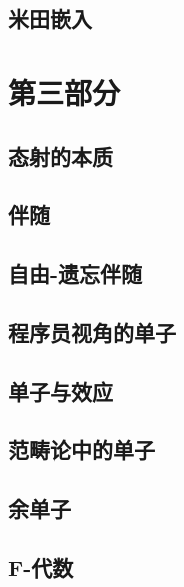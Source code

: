 \chapter{米田嵌入}\label{yoneda-embedding}


\part*{第三部分}

\chapter{态射的本质}\label{all-about-morphisms}


\chapter{伴随}\label{adjunctions}


\chapter{自由-遗忘伴随}\label{free-forgetful-adjunctions}


\chapter{程序员视角的单子}\label{monads-programmers-definition}


\chapter{单子与效应}\label{monads-and-effects}


\chapter{范畴论中的单子}\label{monads-categorically}


\chapter{余单子}\label{comonads}


\chapter{F-代数}\label{f-algebras}


